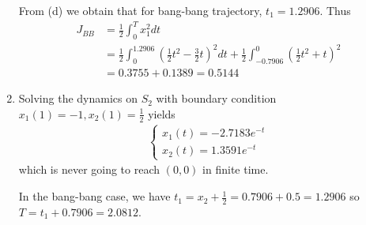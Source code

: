 \documentclass[12pt]{article}
\begin{document}
\begin{problem}[2]
\begin{enumerate}[label=(\alph*)]
From (d) we obtain that for bang-bang trajectory, $ t_1= 1.2906$. Thus
\begin{align*}
	J_{BB} &= \frac{1}{2} \int_{ 0}^{ T} x_1^2 dt \\ 
	&= \frac{1}{2} \int_{ 0}^{ 1.2906} \left( \frac{1}{2} t^2 - \frac{3}{2}t \right)^2 dt + \frac{1}{2} \int_{ -0.7906}^{ 0} \left( \frac{1}{2} t^2 + t  \right)^2    \\
	&= 0.3755 + 0.1389 = 0.5144
\end{align*}
\item Solving the dynamics on $ S_2$ with boundary condition $ x_1(1) =-1, x_2(1)= \frac{1}{2}$ yields
\begin{align*}
	\begin{cases}
		x_1(t) = -2.7183 e^{-t}\\
		x_2(t) = 1.3591 e^{-t}
	\end{cases}
\end{align*}
which is never going to reach $ (0,0)$ in finite time.

In the bang-bang case, we have  $ t_1 = x_2 + \frac{1}{2} = 0.7906 + 0.5 = 1.2906$ so $ T = t_1 + 0.7906 = 2.0812$.
\end{enumerate}
\end{problem}
\end{document}
